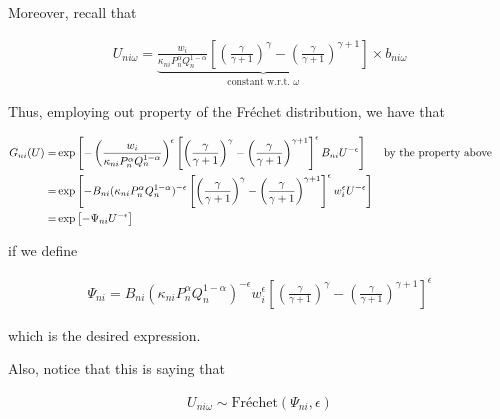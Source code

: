 \documentclass[10pt]{article}
\begin{document}
Moreover, recall that

\begin{align}
    U_{n i \omega}=\underbrace{\frac{w_i}{\kappa_{n i} P_n^\alpha Q_n^{1-\alpha}} \left[\left(\frac{\gamma}{\gamma+1}\right)^\gamma-\left(\frac{\gamma}{\gamma+1}\right)^{\gamma+1}\right]}_{\text {constant w.r.t. } \omega} \times b_{n i \omega}
\end{align}

Thus, employing out property of the Fréchet distribution, we have that

\begin{align}
    G_{n i}(U)=&\exp \left[-\left(\frac{w_i}{\kappa_{n i} P_n^\alpha Q_n^{1-\alpha}}\right)^{\epsilon} \left[\left(\frac{\gamma}{\gamma+1}\right)^\gamma-\left(\frac{\gamma}{\gamma+1}\right)^{\gamma+1}\right]^\epsilon B_{n i} U^{-\epsilon}\right] && \parbox[t]{4cm}{\raggedright by the property above} \\
    =&\exp \left[-B_{ni} (\kappa_{n i} P_n^\alpha Q_n^{1-\alpha})^{-\epsilon} \left[\left(\frac{\gamma}{\gamma+1}\right)^\gamma-\left(\frac{\gamma}{\gamma+1}\right)^{\gamma+1}\right]^\epsilon w_i^\epsilon U^{-\epsilon}\right] \\
    =&\exp \left[- \Psi_{n i} U^{-\epsilon}\right]
\end{align}

if we define

\begin{align}
    \Psi_{n i}=B_{n i}\left(\kappa_{n i} P_n^\alpha Q_n^{1-\alpha}\right)^{-\epsilon} w_i^\epsilon \left[\left(\frac{\gamma}{\gamma+1}\right)^\gamma-\left(\frac{\gamma}{\gamma+1}\right)^{\gamma+1}\right]^\epsilon
\end{align}

which is the desired expression.

Also, notice that this is saying that

\begin{align}
    U_{n i \omega} \sim \text{Fréchet}\left(\Psi_{n i}, \epsilon\right) \label{eq:frechet_indirect_utility_sim}
\end{align}
\end{document}
